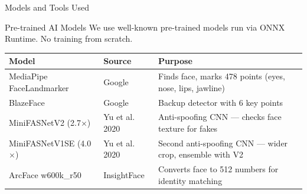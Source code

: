 \documentclass[aspectratio=169,11pt]{beamer}
\begin{document}
\begin{frame}{Models and Tools Used}\small
\begin{block}{Pre-trained AI Models}
\small We use well-known pre-trained models run via ONNX Runtime. No training from scratch.
\end{block}
\vspace{-2pt}
\renewcommand{\arraystretch}{1.15}\scriptsize
\begin{tabular}{@{}p{3.4cm}p{2.2cm}p{7.5cm}@{}}
\toprule
\textbf{Model} & \textbf{Source} & \textbf{Purpose}\\
\midrule
MediaPipe FaceLandmarker & Google & Finds face, marks 478 points (eyes, nose, lips, jawline)\\
BlazeFace & Google & Backup detector with 6 key points\\
MiniFASNetV2 (2.7$\times$) & Yu et al. 2020 & Anti-spoofing CNN --- checks face texture for fakes\\
MiniFASNetV1SE (4.0$\times$) & Yu et al. 2020 & Second anti-spoofing CNN --- wider crop, ensemble with V2\\
ArcFace w600k\_r50 & InsightFace & Converts face to 512 numbers for identity matching\\
\bottomrule
\end{tabular}
\end{frame}
\end{document}
